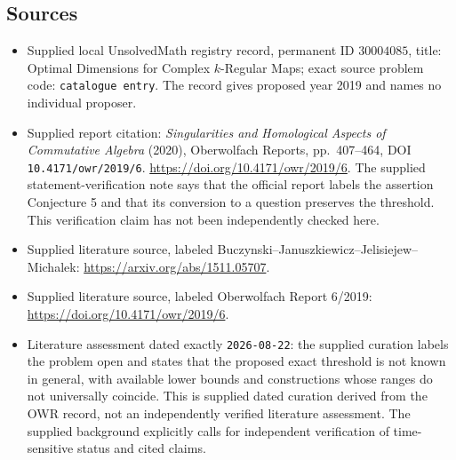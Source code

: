 \documentclass[11pt]{article}
\begin{document}
\subsection{Sources}
\begin{itemize}
\item Supplied local UnsolvedMath registry record, permanent ID \(30004085\), title: Optimal Dimensions for Complex \(k\)-Regular Maps; exact source problem code: \texttt{catalogue entry}. The record gives proposed year 2019 and names no individual proposer.
\item Supplied report citation: \emph{Singularities and Homological Aspects of Commutative Algebra} (2020), Oberwolfach Reports, pp.\ 407--464, DOI \texttt{10.4171/owr/2019/6}. \url{https://doi.org/10.4171/owr/2019/6}. The supplied statement-verification note says that the official report labels the assertion Conjecture 5 and that its conversion to a question preserves the threshold. This verification claim has not been independently checked here.
\item Supplied literature source, labeled Buczynski--Januszkiewicz--Jelisiejew--Michalek: \url{https://arxiv.org/abs/1511.05707}.
\item Supplied literature source, labeled Oberwolfach Report 6/2019: \url{https://doi.org/10.4171/owr/2019/6}.
\item Literature assessment dated exactly \texttt{2026-08-22}: the supplied curation labels the problem open and states that the proposed exact threshold is not known in general, with available lower bounds and constructions whose ranges do not universally coincide. This is supplied dated curation derived from the OWR record, not an independently verified literature assessment. The supplied background explicitly calls for independent verification of time-sensitive status and cited claims.
\end{itemize}
\end{document}
